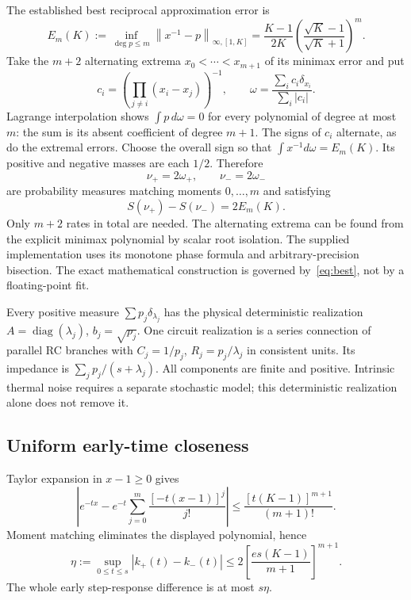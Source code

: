 \documentclass[11pt,a4paper]{article}
\newcommand{\norm}[1]{\left\lVert#1\right\rVert}
\begin{document}
The established best reciprocal approximation error is \cite{kraus}
\begin{equation}\label{eq:best}
E_m(K):=\inf_{\deg p\leq m}\norm{x^{-1}-p}_{\infty,[1,K]}
=\frac{K-1}{2K}\left(\frac{\sqrt K-1}{\sqrt K+1}\right)^m.
\end{equation}
Take the $m+2$ alternating extrema $x_0<\cdots<x_{m+1}$ of its minimax error and put
\[
c_i=\left(\prod_{j\ne i}(x_i-x_j)\right)^{-1},\qquad
\omega=\frac{\sum_i c_i\delta_{x_i}}{\sum_i|c_i|}.
\]
Lagrange interpolation shows $\int p\,d\omega=0$ for every polynomial of degree at most $m$: the sum is its absent coefficient of degree $m+1$. The signs of $c_i$ alternate, as do the extremal errors. Choose the overall sign so that $\int x^{-1}d\omega=E_m(K)$. Its positive and negative masses are each $1/2$. Therefore
\begin{equation}\label{eq:witness}
\nu_+=2\omega_+,\qquad\nu_-=2\omega_-
\end{equation}
are probability measures matching moments $0,\ldots,m$ and satisfying
\begin{equation}
S(\nu_+)-S(\nu_-)=2E_m(K).
\end{equation}
Only $m+2$ rates in total are needed. The alternating extrema can be found from the explicit minimax polynomial by scalar root isolation. The supplied implementation uses its monotone phase formula and arbitrary-precision bisection. The exact mathematical construction is governed by~\eqref{eq:best}, not by a floating-point fit.

Every positive measure $\sum p_j\delta_{\lambda_j}$ has the physical deterministic realization $A=\operatorname{diag}(\lambda_j)$, $b_j=\sqrt{p_j}$. One circuit realization is a series connection of parallel RC branches with $C_j=1/p_j$, $R_j=p_j/\lambda_j$ in consistent units. Its impedance is $\sum_jp_j/(s+\lambda_j)$. All components are finite and positive. Intrinsic thermal noise requires a separate stochastic model; this deterministic realization alone does not remove it.

\subsection{Uniform early-time closeness}

Taylor expansion in $x-1\geq0$ gives
\[
\left|e^{-tx}-e^{-t}\sum_{j=0}^m\frac{[-t(x-1)]^j}{j!}\right|
\leq\frac{[t(K-1)]^{m+1}}{(m+1)!}.
\]
Moment matching eliminates the displayed polynomial, hence
\begin{equation}\label{eq:kernel-bound}
\eta:=\sup_{0\leq t\leq s}|k_+(t)-k_-(t)|
\leq2\left[\frac{es(K-1)}{m+1}\right]^{m+1}.
\end{equation}
The whole early step-response difference is at most $s\eta$.
\end{document}
